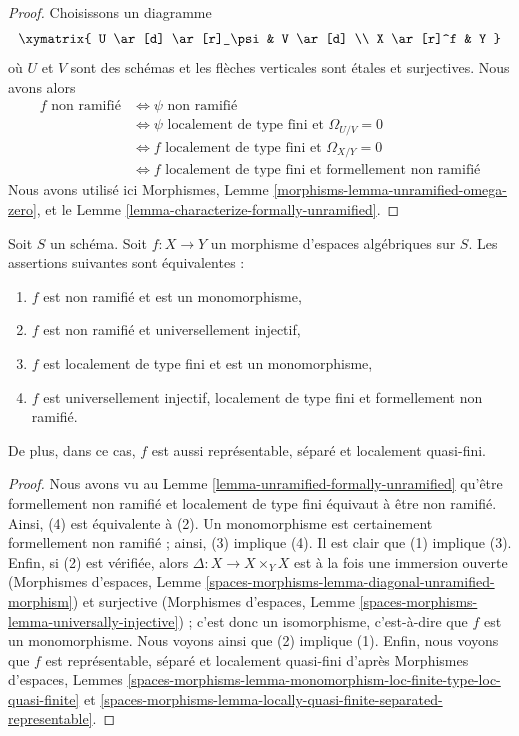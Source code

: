 \begin{proof}
Choisissons un diagramme
$$
\xymatrix{
U \ar[d] \ar[r]_\psi & V \ar[d] \\
X \ar[r]^f & Y
}
$$
où $U$ et $V$ sont des schémas et les flèches verticales sont étales et
surjectives. Nous avons alors
\begin{align*}
f\text{ non ramifié}
& \Leftrightarrow
\psi\text{ non ramifié} \\
& \Leftrightarrow
\psi\text{ localement de type fini et }\Omega_{U/V} = 0 \\
& \Leftrightarrow
f\text{ localement de type fini et }\Omega_{X/Y} = 0 \\
& \Leftrightarrow
f\text{ localement de type fini et formellement non ramifié}
\end{align*}
Nous avons utilisé ici
Morphismes, Lemme \ref{morphisms-lemma-unramified-omega-zero}, et le
Lemme \ref{lemma-characterize-formally-unramified}.
\end{proof}

\begin{lemma}
\label{lemma-universally-injective-unramified}
Soit $S$ un schéma.
Soit $f : X \to Y$ un morphisme d'espaces algébriques sur $S$.
Les assertions suivantes sont équivalentes :
\begin{enumerate}
\item $f$ est non ramifié et est un monomorphisme,
\item $f$ est non ramifié et universellement injectif,
\item $f$ est localement de type fini et est un monomorphisme,
\item $f$ est universellement injectif, localement de type fini et
formellement non ramifié.
\end{enumerate}
De plus, dans ce cas, $f$ est aussi représentable, séparé et
localement quasi-fini.
\end{lemma}

\begin{proof}
Nous avons vu au
Lemme \ref{lemma-unramified-formally-unramified}
qu'être formellement non ramifié et localement de type fini équivaut
à être non ramifié.
Ainsi, (4) est équivalente à (2).
Un monomorphisme est certainement formellement non ramifié ; ainsi, (3) implique (4).
Il est clair que (1) implique (3). Enfin, si (2) est vérifiée, alors
$\Delta : X \to X \times_Y X$ est à la fois une immersion ouverte
(Morphismes d'espaces, Lemme
\ref{spaces-morphisms-lemma-diagonal-unramified-morphism})
et surjective
(Morphismes d'espaces, Lemme
\ref{spaces-morphisms-lemma-universally-injective}) ;
c'est donc un isomorphisme, c'est-à-dire que $f$ est un monomorphisme. Nous voyons ainsi que
(2) implique (1).
Enfin, nous voyons que $f$ est représentable, séparé et localement
quasi-fini d'après
Morphismes d'espaces, Lemmes
\ref{spaces-morphisms-lemma-monomorphism-loc-finite-type-loc-quasi-finite} et
\ref{spaces-morphisms-lemma-locally-quasi-finite-separated-representable}.
\end{proof}

